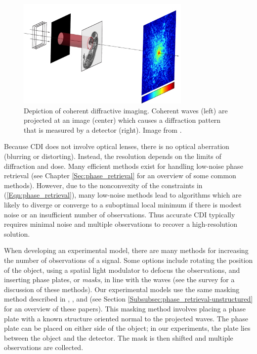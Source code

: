 \begin{figure}[H]
  \centering
    \includegraphics[width=0.75\textwidth]{phase_retrieval_depiction_mod.jpg}
   \caption{Depiction of coherent diffractive imaging.  Coherent waves (left) are projected at an image (center) which causes a diffraction pattern that is measured by a detector (right). Image from \cite{Guizar-Sicairos}.}
   \label{Fig:CDI}
\end{figure}

Because CDI does not involve optical lenses, there is no optical aberration (blurring or distorting).  
Instead, the resolution depends on the limits of diffraction and dose.  
Many efficient methods exist for handling low-noise phase retrieval (see Chapter \ref{Sec:phase_retrieval} for an overview of some common methods).  
However, due to the nonconvexity of the constraints in (\ref{Eqn:phase_retrieval}), many low-noise methods lead to algorithms which are likely to diverge or converge to a suboptimal local minimum if there is modest noise or an insufficient number of observations.  
Thus accurate CDI typically requires minimal noise and multiple observations to recover a high-resolution solution.




When developing an experimental model, there are many methods for increasing the number of observations of a signal.  Some options include rotating the position of the object, using a spatial light modulator to defocus the observations, and inserting phase plates, or \textit{masks}, in line with the waves (see the survey \cite{duadi2011digital} for a discussion of these methods).  Our experimental models use the same masking method described in \cite[Section 2]{DBLP:journals/siamis/CandesESV13}, \cite[Sections 4.2, 4.3]{DBLP:journals/tit/CandesLS15}, and \cite[Section 5.1]{DBLP:journals/siamsc/FriedlanderM16} (see Section \ref{Subsubsec:phase_retrieval-unstructured} for an overview of these papers).  
This masking method involves placing a phase plate with a known structure oriented normal to the projected waves.  The phase plate can be placed on either side of the object; in our experiments, the plate lies between the object and the detector.  The mask is then shifted and multiple observations are collected.




